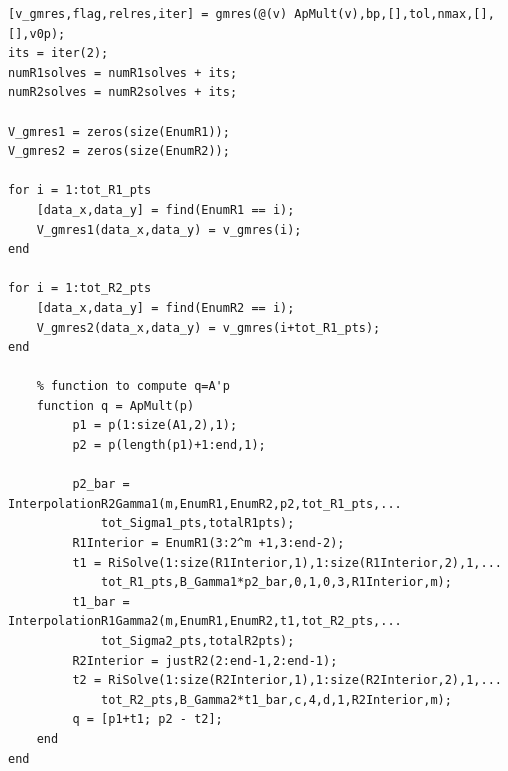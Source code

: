 \documentclass[12pt]{article}
\begin{document}
\begin{itemize}
\begin{lstlisting}[caption=GMRES with Alternating Schwarz Preconditioner]
[v_gmres,flag,relres,iter] = gmres(@(v) ApMult(v),bp,[],tol,nmax,[],[],v0p);
its = iter(2);
numR1solves = numR1solves + its;
numR2solves = numR2solves + its;

V_gmres1 = zeros(size(EnumR1));
V_gmres2 = zeros(size(EnumR2));

for i = 1:tot_R1_pts
    [data_x,data_y] = find(EnumR1 == i);
    V_gmres1(data_x,data_y) = v_gmres(i);
end

for i = 1:tot_R2_pts
    [data_x,data_y] = find(EnumR2 == i);
    V_gmres2(data_x,data_y) = v_gmres(i+tot_R1_pts);
end

    % function to compute q=A'p
    function q = ApMult(p)
         p1 = p(1:size(A1,2),1);
         p2 = p(length(p1)+1:end,1);

         p2_bar = InterpolationR2Gamma1(m,EnumR1,EnumR2,p2,tot_R1_pts,...
             tot_Sigma1_pts,totalR1pts);
         R1Interior = EnumR1(3:2^m +1,3:end-2);
         t1 = RiSolve(1:size(R1Interior,1),1:size(R1Interior,2),1,...
             tot_R1_pts,B_Gamma1*p2_bar,0,1,0,3,R1Interior,m); 
         t1_bar = InterpolationR1Gamma2(m,EnumR1,EnumR2,t1,tot_R2_pts,...
             tot_Sigma2_pts,totalR2pts);
         R2Interior = justR2(2:end-1,2:end-1);
         t2 = RiSolve(1:size(R2Interior,1),1:size(R2Interior,2),1,...
             tot_R2_pts,B_Gamma2*t1_bar,c,4,d,1,R2Interior,m); 
         q = [p1+t1; p2 - t2];
    end
end 
\end{lstlisting}


\end{itemize}


\newpage
\end{document}
